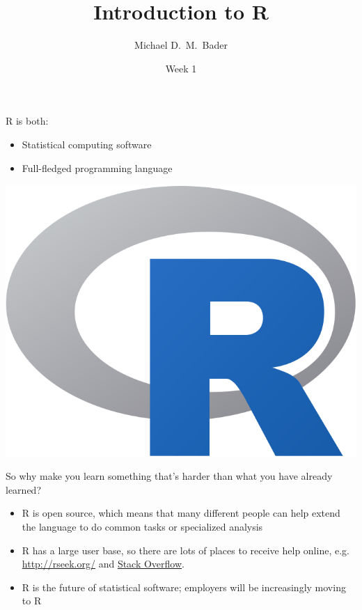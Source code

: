 \documentclass[]{beamer}
\title{Introduction to R}
\author[Bader--SOCY 625]
{Michael D.~M.~Bader}
\institute 
{
  Practicum in Sociological Research (SOCY 625)
}
\date %
{Week 1}
\begin{document}
\maketitle
\begin{frame}
R is both: 
\begin{minipage}{.6\textwidth}
\begin{itemize}
\item Statistical computing software
\item Full-fledged programming language
\end{itemize}
\end{minipage}\begin{minipage}{.39\textwidth}
\includegraphics[width=\textwidth]{images/Rlogo.png}
\end{minipage}
\end{frame}

\begin{frame}
So why make you learn something that's harder than what you have already learned? 
\begin{itemize}
\item R is open source, which means that many different people can help extend the language to do common tasks or specialized analysis\pause
\item R has a large user base, so there are lots of places to receive help online, e.g. \url{http://rseek.org/} and \href{https://stackoverflow.com/questions/tagged/r}{Stack Overflow}.\pause
\item R is the future of statistical software; employers will be increasingly moving to R 
\end{itemize}
\end{frame}
\end{document}
